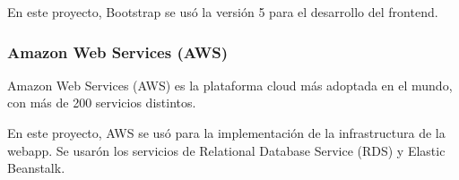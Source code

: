 \documentclass[../informe_krapp.tex]{subfiles}
\begin{document}
En este proyecto, Bootstrap se usó la versión 5 para el desarrollo del frontend.

\subsubsection{Amazon Web Services (AWS)}

Amazon Web Services (AWS) es la plataforma cloud más adoptada en el mundo, con más de 200 servicios distintos.

En este proyecto, AWS se usó para la implementación de la infrastructura de la webapp.
Se usarón los servicios de Relational Database Service (RDS) y Elastic Beanstalk.

\begin{comment}

Segun la referencia de Arduino\cite{arduino_reference}, estas son las cosas que
el framework provee:

\begin{multicols}{2}
	[
		\subsubsection{Funciones}
		Para controlar la placa y realizar cómputos
	]
	\paragraph{Digital I/O}
	\begin{itemize}
		\item digitalRead()
		\item digitalWrite()
		\item pinMode()
	\end{itemize}

	\paragraph{Analog I/O}
	\begin{itemize}
		\item analogRead()
		\item analogReference()
		\item analogWrite()
	\end{itemize}

	\paragraph{Zero, Due \& MKR Family}
	\begin{itemize}
		\item analogReadResolution()
		\item analogWriteResolution()
	\end{itemize}


\end{comment}
\end{document}

